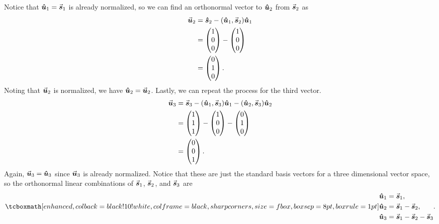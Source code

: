 Notice that $\vu*{u}_{1} = \va*{s}_{1}$ is already normalized, so we can find an orthonormal vector to $\vu*{u}_{2}$ from $\va*{s}_{2}$ as
\begin{align}
    \label{eq:u2-vec}
    \va*{u}_{2} &= \vu*{s}_{2} - (\vu*{u}_{1},\va*{s}_{2})\vu*{u}_{1} \\
                &= \begin{pmatrix} 1 \\ 0 \\ 0\end{pmatrix} - \begin{pmatrix} 1 \\ 0 \\ 0\end{pmatrix} \\
                &= \begin{pmatrix} 0 \\ 1 \\ 0\end{pmatrix}
.\end{align}
Noting that $\va*{u}_{2}$ is normalized, we have $\vu*{u}_{2} = \va*{u}_{2}$.
Lastly, we can repeat the process for the third vector.
\begin{align}
    \label{eq:u3-vec}
\va*{u}_{3} &= \va*{s}_{3} - (\vu*{u}_{1},\va*{s}_{3})\vu*{u}_{1} - (\vu*{u}_{2},\va*{s}_{3})\vu*{u}_{2} \\
           & = \begin{pmatrix} 1 \\ 1 \\ 1\end{pmatrix} - \begin{pmatrix} 1 \\ 0 \\ 0\end{pmatrix} - \begin{pmatrix} 0 \\ 1 \\ 0\end{pmatrix} \\ 
           &= \begin{pmatrix}
    0 \\ 0 \\ 1
    \end{pmatrix}
.\end{align}
Again, $\va*{u}_{3} = \vu*{u}_{3}$ since $\va*{u}_{3}$ is already normalized.
Notice that these are just the standard basis vectors for a three dimensional vector space, so the orthonormal linear combinations of $\va*{s}_{1}$, $\va*{s}_{2}$, and $\va*{s}_{3}$ are
\begin{align}
    \label{orthonormal-vecs} 
    \eqbox{
     \begin{aligned}
        \vu*{u}_{1} &= \va*{s}_{1}, \\
        \vu*{u}_{2} &= \va*{s}_{1} - \va*{s}_{2}, \\
        \vu*{u}_{3} &= \va*{s}_{1} - \va*{s}_{2} - \va*{s}_{3}
     \end{aligned}
    }
.\end{align}



